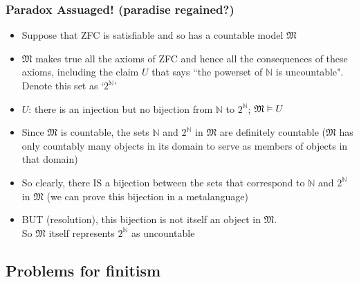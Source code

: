 \begin{frame}
\frametitle{Paradox Assuaged! (paradise regained?)}

\begin{itemize}[<+->]

\item Suppose that ZFC is satisfiable and so has a countable model $\mathfrak{M}$

\item $\mathfrak{M}$ makes true all the axioms of ZFC and hence all the consequences of these axioms, including the claim $U$ that says ``the powerset of $\mathbb{N}$ is uncountable". Denote this set as `$2^{\mathbb{N}}$' 

\item $U$: there is an injection but no bijection from $\mathbb{N}$ to $2^{\mathbb{N}}$; $\mathfrak{M} \vDash U$

\item Since $\mathfrak{M}$ is countable, the sets $\mathbb{N}$ and $2^{\mathbb{N}}$ in $\mathfrak{M}$ are definitely countable ($\mathfrak{M}$ has only countably many objects in its domain to serve as members of objects in that domain)

\item So clearly, there \textcolor{OGlyallpink}{IS} a bijection between the sets that correspond to $\mathbb{N}$ and $2^{\mathbb{N}}$ in $\mathfrak{M}$ (we can prove this bijection in a metalanguage)

\item BUT (\alert{resolution}), this bijection is not itself an object in $\mathfrak{M}$. \\ So $\mathfrak{M}$ itself represents $2^{\mathbb{N}}$ as uncountable

\end{itemize}
\end{frame}


\subsection{Problems for finitism}

